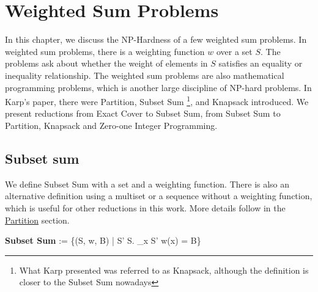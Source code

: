 \chapter{Weighted Sum Problems}\label{chapter:weighted}
In this chapter, we discuss the NP-Hardness of a few weighted sum problems. In weighted sum problems, 
there is a weighting function $w$ over a set $S$. The problems ask about whether the weight of elements 
in $S$ satisfies an equality or inequality relationship. The weighted sum problems are also mathematical programming 
problems, which is another large discipline of NP-hard problems. In Karp's paper, there were Partition, Subset Sum \footnote{What Karp presented was referred to as Knapsack, although
the definition is closer to the Subset Sum nowadays}, and Knapsack introduced. 
We present reductions from Exact Cover to Subset Sum, from Subset Sum to Partition, Knapsack and Zero-one Integer Programming. 

\section{Subset sum}
We define Subset Sum with a set and a weighting function. There is also an alternative definition using a multiset or a sequence without 
a weighting function, which is useful for other reductions in this work. More details follow in the \hyperref[sec:partition]{Partition} section. 
\begin{myalign}
    \textbf{Subset Sum} := \{(S, w, B) | \exists S' \subseteq S. \sum_{x \in S'} w(x) = B\}
\end{myalign}

